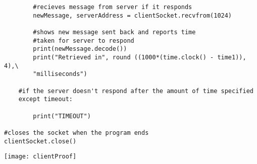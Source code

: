 \documentclass[12pt]{article}
\begin{document}
\begin{enumerate}
\begin{verbatim}
        #recieves message from server if it responds
        newMessage, serverAddress = clientSocket.recvfrom(1024)

        #shows new message sent back and reports time
        #taken for server to respond
        print(newMessage.decode())
        print("Retrieved in", round ((1000*(time.clock() - time1)), 4),\
        "milliseconds")
	
    #if the server doesn't respond after the amount of time specified
    except timeout:

        print("TIMEOUT")

#closes the socket when the program ends
clientSocket.close()
		\end{verbatim}
		\texttt{[image: clientProof]}\\

\end{enumerate}
\end{document}

